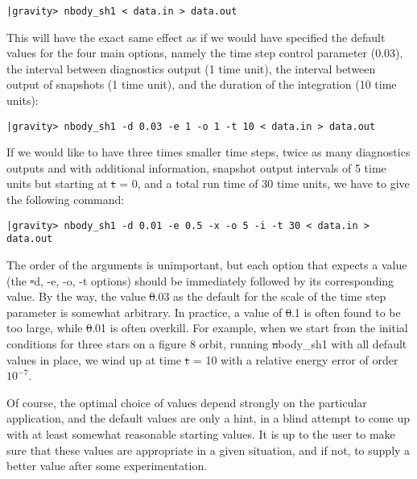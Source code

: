\begin{small}
\begin{verbatim}
|gravity> nbody_sh1 < data.in > data.out
\end{verbatim}
\end{small}

This will have the exact same effect as if we would have specified the
default values for the four main options, namely the time step control
parameter (0.03), the interval between diagnostics output (1 time
unit), the interval between output of snapshots (1 time unit), and the
duration of the integration (10 time units):

\begin{small}
\begin{verbatim}
|gravity> nbody_sh1 -d 0.03 -e 1 -o 1 -t 10 < data.in > data.out
\end{verbatim}
\end{small}

If we would like to have three times smaller time steps, twice as many
diagnostics outputs and with additional information, snapshot output
intervals of 5 time units but starting at {\st t = 0}, and a total run
time of 30 time units, we have to give the following command:

\begin{small}
\begin{verbatim}
|gravity> nbody_sh1 -d 0.01 -e 0.5 -x -o 5 -i -t 30 < data.in > data.out
\end{verbatim}
\end{small}

The order of the arguments is unimportant, but each option that
expects a value (the {\st -d, -e, -o, -t} options) should be
immediately followed by its corresponding value.  By the way, the
value {\st 0.03} as the default for the scale of the time step parameter
is somewhat arbitrary.  In practice, a value of {\st 0.1} is often
found to be too large, while {\st 0.01} is often overkill.  For example,
when we start from the initial conditions for three stars on a figure
8 orbit, running {\st nbody\_sh1} with all default values in place, we
wind up at time {\st t = 10} with a relative energy error of order $10^{-7}$.

Of course, the optimal choice of values depend strongly on the
particular application, and the default values are only a hint, in a
blind attempt to come up with at least somewhat reasonable starting
values.  It is up to the user to make sure that these values are
appropriate in a given situation, and if not, to supply a better value
after some experimentation.

